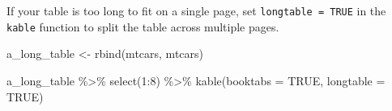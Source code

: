 \documentclass[a4paper, twoside]{templates/ociamthesis}
\newenvironment{Shaded}{\begin{snugshade}}{\end{snugshade}}
\newcommand{\AttributeTok}[1]{\textcolor[rgb]{0.77,0.63,0.00}{#1}}
\newcommand{\ConstantTok}[1]{\textcolor[rgb]{0.00,0.00,0.00}{#1}}
\newcommand{\DecValTok}[1]{\textcolor[rgb]{0.00,0.00,0.81}{#1}}
\newcommand{\FunctionTok}[1]{\textcolor[rgb]{0.00,0.00,0.00}{#1}}
\newcommand{\NormalTok}[1]{#1}
\newcommand{\OtherTok}[1]{\textcolor[rgb]{0.56,0.35,0.01}{#1}}
\newcommand{\SpecialCharTok}[1]{\textcolor[rgb]{0.00,0.00,0.00}{#1}}
\renewenvironment{Shaded}
{
  \vspace{10pt}%
  \begin{snugshade}%
}{%
  \end{snugshade}%
  \vspace{8pt}%
}
\begin{document}
If your table is too long to fit on a single page, set \texttt{longtable\ =\ TRUE} in the \texttt{kable} function to split the table across multiple pages.

\begin{Shaded}
\begin{Highlighting}[]
\NormalTok{a\_long\_table }\OtherTok{\textless{}{-}} \FunctionTok{rbind}\NormalTok{(mtcars, mtcars)}

\NormalTok{a\_long\_table }\SpecialCharTok{\%\textgreater{}\%} 
  \FunctionTok{select}\NormalTok{(}\DecValTok{1}\SpecialCharTok{:}\DecValTok{8}\NormalTok{) }\SpecialCharTok{\%\textgreater{}\%} 
  \FunctionTok{kable}\NormalTok{(}\AttributeTok{booktabs =} \ConstantTok{TRUE}\NormalTok{, }\AttributeTok{longtable =} \ConstantTok{TRUE}\NormalTok{)}
\end{Highlighting}
\end{Shaded}
\end{document}
